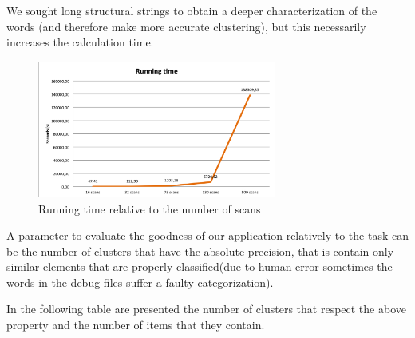 We sought long structural strings to obtain a deeper characterization of the words (and therefore make more accurate clustering), but this necessarily increases the calculation time.

\begin{figure}[!htbp]
\centering
\includegraphics[width=0.7\textwidth]{images/esecuzione}
\caption{Running time relative to the number of scans}
\label{fig:time}
\end{figure}

A parameter to evaluate the goodness of our application relatively to the task can be the number of clusters that have the absolute precision, that is contain only similar elements that are properly classified(due to human error sometimes the words in the debug files suffer a faulty categorization).

In the following table are presented the number of clusters that respect the above property and the number of items that they contain. 

